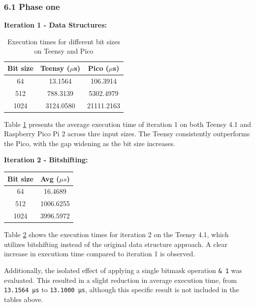 \hypertarget{phase-one-1}{%
\subsubsection{6.1 Phase one}\label{phase-one-1}}

\textbf{Iteration 1 - Data Structures:}

\begin{table}[ht] \centering \begin{tabular}{|c|c|c|} \hline \textbf{Bit size} &
\textbf{Teensy ($\mu$s)} & \textbf{Pico ($\mu$s)} \\ \hline 64 & 13.1564 &
106.3914 \\ 512 & 788.3139 & 5302.4979 \\ 1024 & 3124.0580 & 21111.2163 \\
\hline \end{tabular} \caption{Execution times for different bit sizes on Teensy
and Pico} \label{tab:iter1} \end{table}

Table \ref{tab:iter1} presents the average execution time of iteration 1 on both Teensy 4.1 and Raspberry Pico Pi 2 across thre input sizes. The Teensy consistently outperforms the Pico, with the gap widening as the bit size increases.

\textbf{Iteration 2 - Bitshifting:}

\begin{table}[ht]\begin{tabular}{|c|c|} \hline \textbf{Bit size} &
\multicolumn{1}{c|}{\textbf{Avg ($\mu s$)}} \\ \hline 64 & 16.4689 \\ 512 &
1006.6255 \\ 1024 & 3996.5972 \\ \hline \end{tabular}
\label{tab:iter2}\end{table}

Table \ref{tab:iter2} shows the execution times for iteration 2 on the Teensy 4.1, which utilizes bitshifting instead of the original data structure approach. A clear increase in executiom time compared to iteration 1 is observed.

Additionally, the isolated effect of applying a single bitmask operation \texttt{\&\ 1} was evaluated. This resulted in a slight reduction in average execution time, from \texttt{13.1564\ µs} to \texttt{13.1000\ µs}, although this specific result is not included in the tables above.

